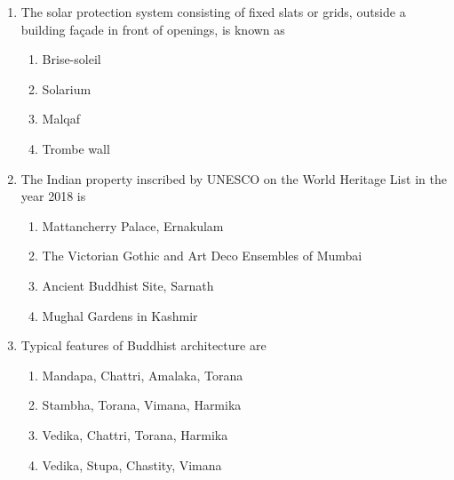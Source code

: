 \documentclass[12pt]{article}
\begin{document}
\begin{enumerate}[label=Q.\arabic*]
	\item The solar protection system consisting of fixed slats or grids, outside a building façade in front of openings, is known as
		\begin{multicols}{2}
			\begin{enumerate}
				\item Brise-soleil
				\item Solarium
				\item Malqaf
				\item Trombe wall
			\end{enumerate}
		\end{multicols}

	\item The Indian property inscribed by UNESCO on the World Heritage List in the year 2018 is
		\begin{enumerate}
			\item Mattancherry Palace, Ernakulam
			\item The Victorian Gothic and Art Deco Ensembles of Mumbai
			\item Ancient Buddhist Site, Sarnath
			\item Mughal Gardens in Kashmir
		\end{enumerate}

	\item Typical features of Buddhist architecture are
		\begin{multicols}{2}
			\begin{enumerate}
				\item Mandapa, Chattri, Amalaka, Torana
				\item Stambha, Torana, Vimana, Harmika
				\item Vedika, Chattri, Torana, Harmika
				\item Vedika, Stupa, Chastity, Vimana
			\end{enumerate}
		\end{multicols}


\end{enumerate}
\end{document}
